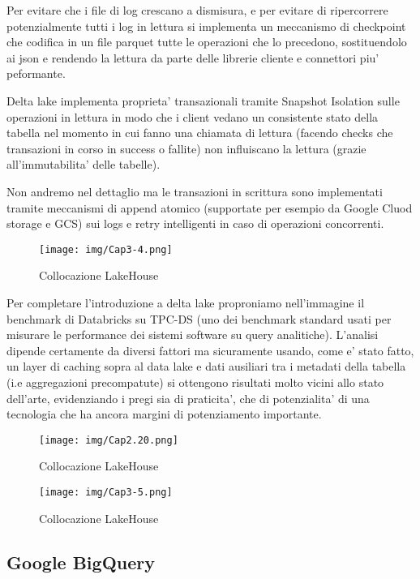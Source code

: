 \documentclass[a4paper,12pt]{report}
\begin{document}
\noindent
Per evitare che i file di log crescano a dismisura, e per evitare di ripercorrere potenzialmente tutti i log in lettura si implementa un meccanismo di checkpoint che codifica in un file parquet tutte le operazioni che lo precedono, sostituendolo ai json e rendendo la lettura da parte delle librerie cliente e connettori piu’ peformante.

\noindent
Delta lake implementa proprieta’ transazionali tramite Snapshot Isolation sulle operazioni in lettura in modo che i client vedano un consistente stato della tabella nel momento in cui fanno una chiamata di lettura (facendo checks che transazioni in corso in success o fallite) non influiscano la lettura (grazie all’immutabilita’ delle tabelle).

\noindent
Non andremo nel dettaglio ma le transazioni in scrittura sono implementati tramite meccanismi di append atomico (supportate per esempio da Google Cluod storage e GCS) sui logs e retry intelligenti in caso di operazioni concorrenti.

\begin{figure}[h]
    \centering
    \texttt{[image: img/Cap3-4.png]}
    \caption{Collocazione LakeHouse}
\end{figure}

Per completare l’introduzione a delta lake proproniamo nell’immagine il benchmark di Databricks su TPC-DS (uno dei benchmark standard usati per misurare le performance dei sistemi software su query analitiche). 
L’analisi dipende certamente da diversi fattori ma sicuramente usando, come e’ stato fatto, un layer di caching sopra al data lake e dati ausiliari tra i metadati della tabella (i.e aggregazioni precompatute) si ottengono risultati molto vicini allo stato dell’arte, evidenziando i pregi sia di praticita’, che di potenzialita’ di una tecnologia che ha ancora margini di potenziamento importante.

\begin{figure}[h]
    \centering
    \texttt{[image: img/Cap2.20.png]}
    \caption{Collocazione LakeHouse}
\end{figure}

\begin{figure}[h]
    \centering
    \texttt{[image: img/Cap3-5.png]}
    \caption{Collocazione LakeHouse}
\end{figure}


\subsection{Google BigQuery}
\end{document}
